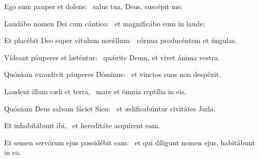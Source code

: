 
\item Ego sum pauper et dolens:~\psstar{} salus tua, Deus, suscépit me.

\item Laudábo nomen Dei cum cántico:~\psstar{} et magnificábo eum in laude:

\item Et placébit Deo super vítulum novéllum:~\psstar{} córnua producéntem et úngulas.

\item Vídeant páuperes et læténtur:~\psstar{} quǽrite Deum, et vivet ánima vestra.

\item Quóniam exaudívit páuperes Dóminus:~\psstar{} et vinctos suos non despéxit.

\item Laudent illum cæli et terra,~\psstar{} mare et ómnia reptília in eis.

\item Quóniam Deus salvam fáciet Sion:~\psstar{} et ædificabúntur civitátes Juda.

\item Et inhabitábunt ibi,~\psstar{} et hereditáte acquírent eam.

\item Et semen servórum ejus possidébit eam:~\psstar{} et qui díligunt nomen ejus, habitábunt in ea.
